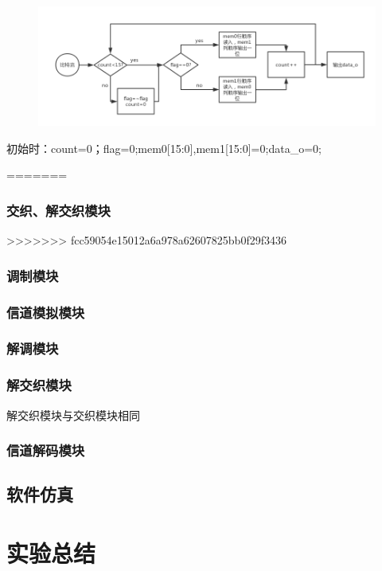 \documentclass[UTF8]{ctexart}
\begin{document}
\begin{figure}[H]
    \centering
    \includegraphics[width=\textwidth]{images//inter_pic.png}
\end{figure}

初始时：count=0；flag=0;mem0[15:0],mem1[15:0]=0;data\_o=0;

\newpage
=======
\subsubsection{交织、解交织模块}

>>>>>>> fcc59054e15012a6a978a62607825bb0f29f3436

\subsubsection{调制模块}

\subsubsection{信道模拟模块}

\subsubsection{解调模块}

\subsubsection{解交织模块}

解交织模块与交织模块相同

\subsubsection{信道解码模块}


\subsection{软件仿真}


\section{实验总结}

\end{document}
